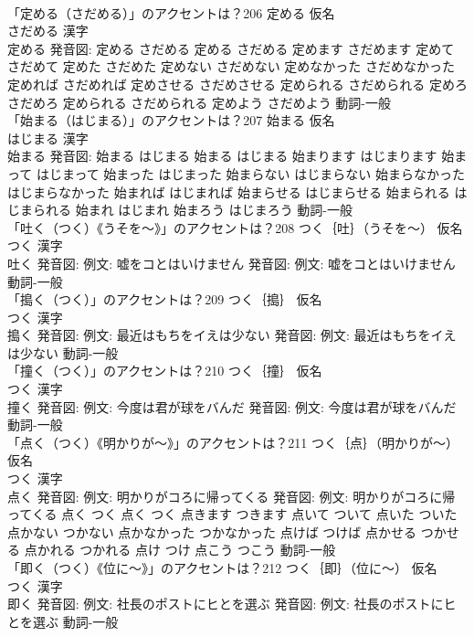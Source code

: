\documentclass[8pt]{extreport}
\begin{document}
\begin{CJK}{UTF8}{min}
\\	「定める（さだめる）」のアクセントは？206	定める 仮名　
\\	さだめる 漢字　
\\	定める 発音図:	定める さだめる		定める さだめる 定めます さだめます 定めて さだめて 定めた さだめた 定めない さだめない 定めなかった さだめなかった 定めれば さだめれば 定めさせる さだめさせる 定められる さだめられる 定めろ さだめろ 定められる さだめられる 定めよう さだめよう				動詞-一般 
\\	「始まる（はじまる）」のアクセントは？207	始まる 仮名　
\\	はじまる 漢字　
\\	始まる 発音図:	始まる はじまる		始まる はじまる 始まります はじまります 始まって はじまって 始まった はじまった 始まらない はじまらない 始まらなかった はじまらなかった 始まれば はじまれば 始まらせる はじまらせる 始まられる はじまられる 始まれ はじまれ 始まろう はじまろう				動詞-一般 
\\	「吐く（つく）《うそを〜》」のアクセントは？208	つく｛吐｝（うそを〜） 仮名　
\\	つく 漢字　
\\	吐く 発音図: 例文: 嘘をコとはいけません 発音図: 例文: 嘘をコとはいけません							動詞-一般 
\\	「搗く（つく）」のアクセントは？209	つく｛搗｝ 仮名　
\\	つく 漢字　
\\	搗く 発音図: 例文: 最近はもちをイえは少ない 発音図: 例文: 最近はもちをイえは少ない							動詞-一般 
\\	「撞く（つく）」のアクセントは？210	つく｛撞｝ 仮名　
\\	つく 漢字　
\\	撞く 発音図: 例文: 今度は君が球をバんだ 発音図: 例文: 今度は君が球をバんだ							動詞-一般 
\\	「点く（つく）《明かりが〜》」のアクセントは？211	つく｛点｝（明かりが〜） 仮名　
\\	つく 漢字　
\\	点く 発音図: 例文: 明かりがコろに帰ってくる 発音図: 例文: 明かりがコろに帰ってくる	点く つく		点く つく 点きます つきます 点いて ついて 点いた ついた 点かない つかない 点かなかった つかなかった 点けば つけば 点かせる つかせる 点かれる つかれる 点け つけ 点こう つこう				動詞-一般 
\\	「即く（つく）《位に〜》」のアクセントは？212	つく｛即｝（位に〜） 仮名　
\\	つく 漢字　
\\	即く 発音図: 例文: 社長のポストにヒとを選ぶ 発音図: 例文: 社長のポストにヒとを選ぶ							動詞-一般 

\end{CJK}
\end{document}
